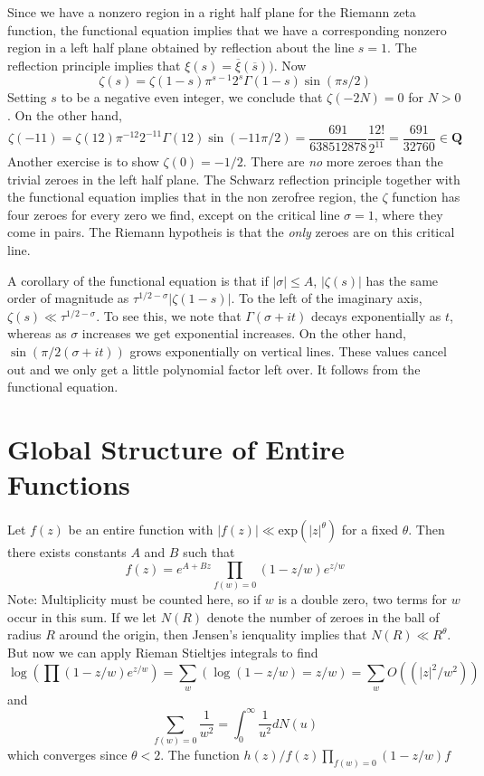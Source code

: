 Since we have a nonzero region in a right half plane for the Riemann zeta function, the functional equation implies that we have a corresponding nonzero region in a left half plane obtained by reflection about the line $s = 1$. The reflection principle implies that $\xi(s) = \overline{\xi}(\overline{s}))$. Now
%
\[ \zeta(s) = \zeta(1-s) \pi^{s-1} 2^s \Gamma(1-s) \sin(\pi s/2) \]
%
Setting $s$ to be a negative even integer, we conclude that $\zeta(-2N) = 0$ for $N > 0$. On the other hand,
%
\[ \zeta(-11) = \zeta(12) \pi^{-12} 2^{-11} \Gamma(12) \sin(-11 \pi/2) = \frac{691}{638512878} \frac{12!}{2^{11}} = \frac{691}{32760} \in \mathbf{Q} \]
%
Another exercise is to show $\zeta(0) = -1/2$. There are {\it no} more zeroes than the trivial zeroes in the left half plane. The Schwarz reflection principle together with the functional equation implies that in the non zerofree region, the $\zeta$ function has four zeroes for every zero we find, except on the critical line $\sigma = 1$, where they come in pairs. The Riemann hypotheis is that the {\it only} zeroes are on this critical line.

A corollary of the functional equation is that if $|\sigma| \leq A$, $|\zeta(s)|$ has the same order of magnitude as $\tau^{1/2 - \sigma} |\zeta(1-s)|$. To the left of the imaginary axis, $\zeta(s) \ll \tau^{1/2 - \sigma}$. To see this, we note that $\Gamma(\sigma + it)$ decays exponentially as $t$, whereas as $\sigma$ increases we get exponential increases. On the other hand, $\sin(\pi/2(\sigma + it))$ grows exponentially on vertical lines. These values cancel out and we only get a little polynomial factor left over. It follows from the functional equation.

\section{Global Structure of Entire Functions}

Let $f(z)$ be an entire function with $|f(z)| \ll \text{exp}(|z|^\theta)$ for a fixed $\theta$. Then there exists constants $A$ and $B$ such that
%
\[ f(z) = e^{A + Bz} \prod_{f(w) = 0} (1 - z/w) e^{z/w} \]
%
Note: Multiplicity must be counted here, so if $w$ is a double zero, two terms for $w$ occur in this sum. If we let $N(R)$ denote the number of zeroes in the ball of radius $R$ around the origin, then Jensen's ienquality implies that $N(R) \ll R^\theta$. But now we can apply Rieman Stieltjes integrals to find
%
\[ \log(\prod (1 - z/w)e^{z/w}) = \sum_w (\log(1-z/w) = z/w) = \sum_w O((|z|^2/w^2)) \]
%
and
%
\[ \sum_{f(w) = 0} \frac{1}{w^2} = \int_0^\infty \frac{1}{u^2} dN(u) \]
%
which converges since $\theta < 2$. The function $h(z)/f(z) \prod_{f(w) = 0} (1 - z/w) f$

